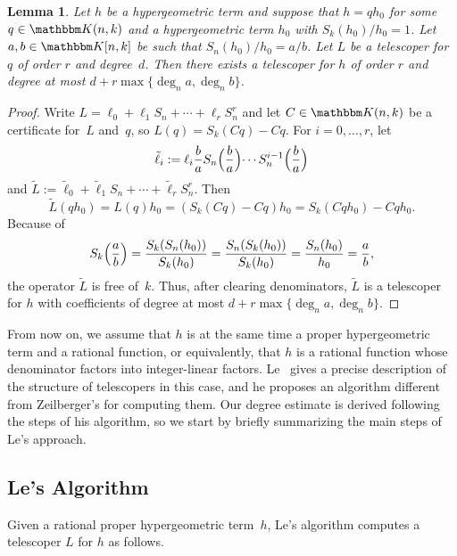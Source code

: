 \documentclass{sig-alternate}
\newtheorem{lemma}[theorem]{Lemma}
\let\set\mathbbm
\def\K{\set K}
\def\deg{\operatorname{deg}}
\begin{document}
\begin{lemma}
  Let $h$ be a hypergeometric term and suppose that $h=qh_0$ for some $q\in\K(n,k)$ and a hypergeometric
  term $h_0$ with $S_k(h_0)/h_0=1$. Let $a,b\in\K[n,k]$ be such that $S_n(h_0)/h_0=a/b$.
  Let $L$ be a telescoper for $q$ of order $r$ and degree~$d$.
  Then there exists a telescoper for $h$ of order $r$ and degree at most
  $d+r\max\{\deg_n a, \deg_n b\}$.
\end{lemma}
\begin{proof}
  Write $L=\ell_0+\ell_1S_n+\cdots+\ell_rS_n^r$ and let $C\in\K(n,k)$ be a certificate
  for~$L$ and~$q$, so $L(q)=S_k(Cq)-Cq$. For $i=0,\dots,r$, let
  \[
    \tilde\ell_i := \ell_i \frac ba S_n\Bigl(\frac ba\Bigl)\cdots S_n^{i-1}\Bigl(\frac ba\Bigr)
  \]
  and $\tilde L:=\tilde\ell_0+\tilde\ell_1 S_n + \cdots + \tilde\ell_rS_n^r$. Then
  \[
    \tilde L(qh_0) = L(q)h_0 = (S_k(Cq)-Cq)h_0 = S_k(Cqh_0)-Cqh_0.
  \]
  Because of
  \[
    S_k\Bigl(\frac ab\Bigr) = \frac{S_k(S_n(h_0))}{S_k(h_0)}=
    \frac{S_n(S_k(h_0))}{S_k(h_0)}=\frac{S_n(h_0)}{h_0}=\frac ab,
  \]
  the operator $\tilde L$ is free of~$k$. Thus, after clearing denominators, $\tilde L$ is
  a telescoper for $h$ with coefficients of degree at most $d+r\max\{\deg_n a,\deg_n b\}$.
\end{proof}

{}From now on, we assume that $h$ is at the same time a proper hypergeometric term and a rational
function, or equivalently, that $h$ is a rational function whose denominator factors into integer-linear
factors. Le~\cite{le03} gives a precise description of the structure of telescopers in this case, and he
proposes an algorithm different from Zeilberger's for computing them. Our degree estimate is derived
following the steps of his algorithm, so we start by briefly summarizing the main steps of Le's approach.

\subsection{Le's Algorithm}\label{sec:le}

Given a rational proper hypergeometric term~$h$, Le's algorithm computes a telescoper $L$ for $h$ as follows.
\end{document}
